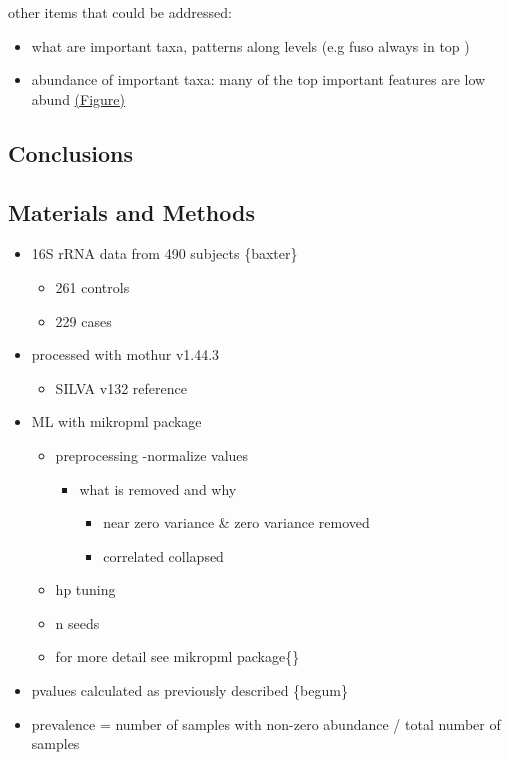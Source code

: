 \documentclass[
]{article}
\providecommand{\tightlist}{%
  \setlength{\itemsep}{0pt}\setlength{\parskip}{0pt}}
\begin{document}
other items that could be addressed:

\begin{itemize}
\tightlist
\item
  what are important taxa, patterns along levels (e.g fuso always in top
  )
\item
  abundance of important taxa: many of the top important features are
  low abund
  \protect\hyperlink{relative-abundance-of-important-features}{(Figure)}
\end{itemize}

\hypertarget{conclusions}{%
\subsection{Conclusions}\label{conclusions}}

\hypertarget{materials-and-methods}{%
\subsection{Materials and Methods}\label{materials-and-methods}}

\begin{itemize}
\tightlist
\item
  16S rRNA data from 490 subjects \{baxter\}

  \begin{itemize}
  \tightlist
  \item
    261 controls
  \item
    229 cases
  \end{itemize}
\item
  processed with mothur v1.44.3

  \begin{itemize}
  \tightlist
  \item
    SILVA v132 reference
  \end{itemize}
\item
  ML with mikropml package

  \begin{itemize}
  \tightlist
  \item
    preprocessing -normalize values

    \begin{itemize}
    \tightlist
    \item
      what is removed and why

      \begin{itemize}
      \tightlist
      \item
        near zero variance \& zero variance removed
      \item
        correlated collapsed
      \end{itemize}
    \end{itemize}
  \item
    hp tuning
  \item
    n seeds
  \item
    for more detail see mikropml package\{\}
  \end{itemize}
\item
  pvalues calculated as previously described \{begum\}
\item
  prevalence = number of samples with non-zero abundance / total number
  of samples
\end{itemize}
\end{document}

